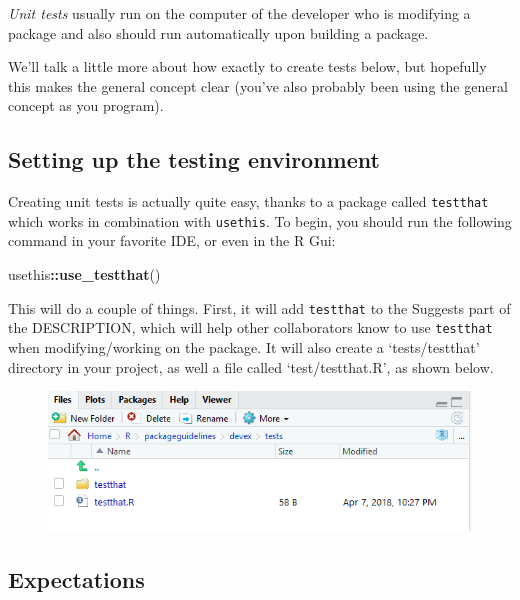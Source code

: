 \documentclass[]{book}
\newenvironment{Shaded}{\begin{snugshade}}{\end{snugshade}}
\newcommand{\KeywordTok}[1]{\textcolor[rgb]{0.13,0.29,0.53}{\textbf{#1}}}
\newcommand{\OperatorTok}[1]{\textcolor[rgb]{0.81,0.36,0.00}{\textbf{#1}}}
\newcommand{\NormalTok}[1]{#1}
\begin{document}
\emph{Unit tests} usually run on the computer of the developer who is
modifying a package and also should run automatically upon building a
package.

We'll talk a little more about how exactly to create tests below, but
hopefully this makes the general concept clear (you've also probably
been using the general concept as you program).

\subsection{Setting up the testing
environment}\label{setting-up-the-testing-environment}

Creating unit tests is actually quite easy, thanks to a package called
\texttt{testthat} which works in combination with \texttt{usethis}. To
begin, you should run the following command in your favorite IDE, or
even in the R Gui:

\begin{Shaded}
\begin{Highlighting}[]
\NormalTok{usethis}\OperatorTok{::}\KeywordTok{use_testthat}\NormalTok{()}
\end{Highlighting}
\end{Shaded}

This will do a couple of things. First, it will add \texttt{testthat} to
the Suggests part of the DESCRIPTION, which will help other
collaborators know to use \texttt{testthat} when modifying/working on
the package. It will also create a `tests/testthat' directory in your
project, as well a file called `test/testthat.R', as shown below.

\begin{figure}
\centering
\includegraphics{images/testSS/devtoolstestthat.PNG}
\caption{}
\end{figure}

\subsection{Expectations}\label{expectations}
\end{document}

